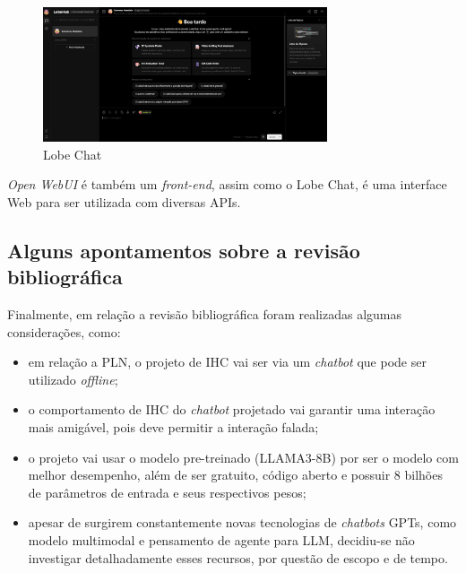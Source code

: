 \documentclass[10pt, conference, compsocconf]{IEEEtran}
\begin{document}
\FloatBarrier

\begin{figure}[!h]
\centering
\includegraphics[width=3.3in]{images/Lobe HUB UI.png}
\caption{Lobe Chat \cite{Lobe-Chat}} 
\label{fig:Lobe-Chat}
\end{figure}

\FloatBarrier

\textit{Open WebUI} é também um \textit{front-end}, assim como o Lobe Chat, é uma interface Web para ser utilizada com diversas APIs.



\subsection{Alguns apontamentos sobre a revisão bibliográfica}
Finalmente, em relação a revisão bibliográfica foram realizadas algumas considerações, como:
\begin{itemize}
    \item em relação a PLN, o projeto de IHC vai ser via um \textit{chatbot} que pode ser utilizado \textit{offline};
    \item o comportamento de IHC do \textit{chatbot} projetado vai garantir uma interação mais amigável, pois deve permitir a interação falada;
    \item  o projeto vai usar o modelo pre-treinado (LLAMA3-8B) por ser o modelo com melhor desempenho, além de ser gratuito, código aberto e possuir 8 bilhões de parâmetros de entrada e seus respectivos pesos;
    \item  apesar de surgirem constantemente novas tecnologias de \textit{chatbots} GPTs, como modelo multimodal e pensamento de agente para LLM, decidiu-se não investigar detalhadamente esses recursos, por questão de escopo e de tempo.
\end{itemize}
\end{document}
